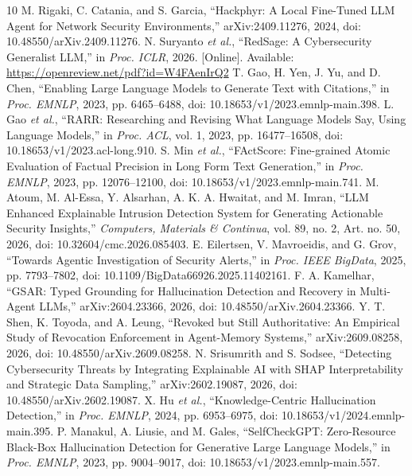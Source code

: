 \begin{thebibliography}{10}
 M. Rigaki, C. Catania, and S. Garcia, ``Hackphyr: A Local Fine-Tuned LLM Agent for Network Security Environments,'' arXiv:2409.11276, 2024, doi: 10.48550/arXiv.2409.11276.
 N. Suryanto \emph{et al.}, ``RedSage: A Cybersecurity Generalist LLM,'' in \emph{Proc. ICLR}, 2026. [Online]. Available: \url{https://openreview.net/pdf?id=W4FAenIrQ2}
 T. Gao, H. Yen, J. Yu, and D. Chen, ``Enabling Large Language Models to Generate Text with Citations,'' in \emph{Proc. EMNLP}, 2023, pp. 6465--6488, doi: 10.18653/v1/2023.emnlp-main.398.
 L. Gao \emph{et al.}, ``RARR: Researching and Revising What Language Models Say, Using Language Models,'' in \emph{Proc. ACL}, vol. 1, 2023, pp. 16477--16508, doi: 10.18653/v1/2023.acl-long.910.
 S. Min \emph{et al.}, ``FActScore: Fine-grained Atomic Evaluation of Factual Precision in Long Form Text Generation,'' in \emph{Proc. EMNLP}, 2023, pp. 12076--12100, doi: 10.18653/v1/2023.emnlp-main.741.
 M. Atoum, M. Al-Essa, Y. Alsarhan, A. K. A. Hwaitat, and M. Imran, ``LLM Enhanced Explainable Intrusion Detection System for Generating Actionable Security Insights,'' \emph{Computers, Materials \& Continua}, vol. 89, no. 2, Art. no. 50, 2026, doi: 10.32604/cmc.2026.085403.
 E. Eilertsen, V. Mavroeidis, and G. Grov, ``Towards Agentic Investigation of Security Alerts,'' in \emph{Proc. IEEE BigData}, 2025, pp. 7793--7802, doi: 10.1109/BigData66926.2025.11402161.
 F. A. Kamelhar, ``GSAR: Typed Grounding for Hallucination Detection and Recovery in Multi-Agent LLMs,'' arXiv:2604.23366, 2026, doi: 10.48550/arXiv.2604.23366.
 Y. T. Shen, K. Toyoda, and A. Leung, ``Revoked but Still Authoritative: An Empirical Study of Revocation Enforcement in Agent-Memory Systems,'' arXiv:2609.08258, 2026, doi: 10.48550/arXiv.2609.08258.
 N. Srisumrith and S. Sodsee, ``Detecting Cybersecurity Threats by Integrating Explainable AI with SHAP Interpretability and Strategic Data Sampling,'' arXiv:2602.19087, 2026, doi: 10.48550/arXiv.2602.19087.
 X. Hu \emph{et al.}, ``Knowledge-Centric Hallucination Detection,'' in \emph{Proc. EMNLP}, 2024, pp. 6953--6975, doi: 10.18653/v1/2024.emnlp-main.395.
 P. Manakul, A. Liusie, and M. Gales, ``SelfCheckGPT: Zero-Resource Black-Box Hallucination Detection for Generative Large Language Models,'' in \emph{Proc. EMNLP}, 2023, pp. 9004--9017, doi: 10.18653/v1/2023.emnlp-main.557.

\end{thebibliography}
